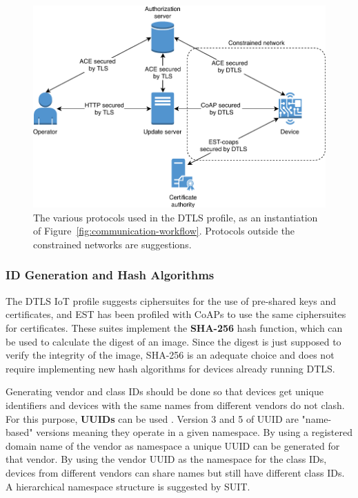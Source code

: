 \documentclass[0-thesis.tex]{subfiles}
\begin{document}
\begin{figure}[h]
    \caption[The various protocols used in the DTLS profile.]
        {The various protocols used in the DTLS profile, as an instantiation of
            Figure~\ref{fig:communication-workflow}. Protocols outside the constrained networks are suggestions.}
    \label{fig:dtls-profile}
    \includegraphics{images/dtls-profile.pdf}
\end{figure}

\subsubsection{ID Generation and Hash Algorithms}
\label{sssec:hash-id-algorithm}
The DTLS IoT profile suggests ciphersuites for the use of pre-shared keys and
certificates, and EST has been profiled with CoAPs to use the same ciphersuites for
certificates. These suites implement the \textbf{SHA-256} hash function, which can be used
to calculate the digest of an image. Since the digest is just supposed to verify the
integrity of the image, SHA-256 is an adequate choice and does not require implementing
new hash algorithms for devices already running DTLS.

Generating vendor and class IDs should be done so that devices get unique identifiers and
devices with the same names from different vendors do not clash. For this purpose,
\textbf{UUIDs} can be used \parencite{rfc4122}. Version 3 and 5 of UUID are "name-based"
versions meaning they operate in a given namespace. By using a registered domain name of
the vendor as namespace a unique UUID can be generated for that vendor. By using the
vendor UUID as the namespace for the class IDs, devices from different vendors can share
names but still have different class IDs. A hierarchical namespace structure is suggested
by SUIT.
\end{document}
